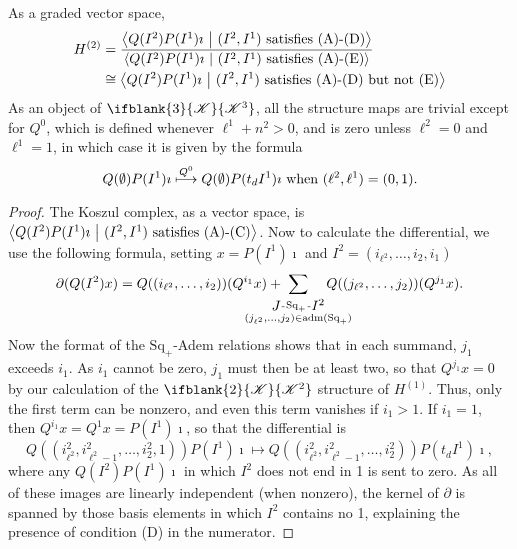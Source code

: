 \documentclass[10pt]{article}
\makeatletter
\newcommand{\LL}[1]{\ifblank{#1}{\scrK}{\scrK^{#1}}}
\newcommand{\produces}[3]{{#1}{#3}{#2}}
\newcommand{\admis}[1]{\mathrm{adm}(#1)}%
\renewcommand{\Q}{Q}
\newcommand{\SqShift}{\Sq_{+}}
\newcommand{\Sq}{\mathrm{Sq}}
\renewcommand{\produces}[3]{
{
\def\labelstyle{\scriptstyle}
\xymatrix@C=2em@1{
{#1}
\ar@{-}[r]|-{{\,#3\,}}
&%
{#2}%
}}}
\makeatother
\begin{document}
\begin{CalculatingRepeatedKoszul}
\begin{prop}
As a graded vector space,
\begin{alignat*}{2}
H^{(2)}
&=
\frac{\left\langle \Q(I^2)P(I^1)\imath\ \middle|\  (I^2,I^1)\textup{ satisfies \textup{(A)}-\textup{(D)}}\right\rangle}{\left\langle \Q(I^2)P(I^1)\imath\ \middle|\  (I^2,I^1)\textup{ satisfies \textup{(A)}-\textup{(E)}}\right\rangle}%
\\
&\cong
{\left\langle \Q(I^2)P(I^1)\imath\ \middle|\  (I^2,I^1)\textup{ satisfies \textup{(A)}-\textup{(D)} but not \textup{(E)}}\right\rangle}%
\end{alignat*}
As an object of $\LL{3}$, all the structure maps are trivial except for $\Q^0$, which is defined whenever $\ell^1+n^2>0$, and is zero unless $\ell^2=0$ and $\ell^1=1$, in which case it is given by the formula \[\Q(\emptyset)P(I^1)\imath \overset{\Q^0}{\mapsto} \Q(\emptyset)P(t_dI^1)\imath\textup{ when $(\ell^2,\ell^1)=(0,1)$}.\]
\end{prop}
\begin{proof}
The Koszul complex, as a vector space, is $\left\langle \Q(I^2)P(I^1)\imath\ \middle|\ (I^2,I^1)\textup{ satisfies \textup{(A)}-\textup{(C)}}\right\rangle$. %
Now to calculate the differential, we use the following formula, setting $x=P(I^1)\imath$ and $I^2=(i_{\ell^2},\ldots,i_2,i_1)$
\[\partial(\Q(I^2)x)=\Q((i_{\ell^2},\ldots,i_2))(\Q^{i_1}x)+\!\!\!\!\!\!\!\!\!\!\!\!\!\!\!\!\!\sum_{\substack{\produces{J}{I^2}{\SqShift}\\(j_{\ell^2},\ldots,j_2)\in\admis{\SqShift}}}\!\!\!\!\!\!\!\!\!\!\!\! \Q((j_{\ell^2},\ldots,j_2))(\Q^{j_1}x).\]
Now the format of the $\SqShift$-Adem relations shows that in each summand, $j_1$ exceeds $i_1$. As $i_1$ cannot be zero, $j_1$ must then be at least two, so that $Q^{j_1}x=0$ by our calculation of the $\LL{2}$ structure of $H^{(1)}$. Thus, only the first term can be nonzero, and even this term vanishes if $i_1>1$. If $i_1=1$, then $\Q^{i_1}x=\Q^1x=P(I^1)\imath$, so that the differential is
\[\Q((i^2_{\ell^2},i^2_{\ell^2-1},\ldots,i^2_{2},1))P(I^1)\imath\mapsto \Q((i^2_{\ell^2},i^2_{\ell^2-1},\ldots,i^2_{2}))P(t_dI^1)\imath,\]
where any $\Q(I^2)P(I^1)\imath$ in which $I^2$ does not end in 1 is sent to zero. As all of these images are linearly independent (when nonzero), the kernel of $\partial$ is spanned by those basis elements in which $I^2$ contains no 1, explaining the presence of condition \textup{(D)} in the numerator.


\end{proof}
\end{CalculatingRepeatedKoszul}
\end{document}
